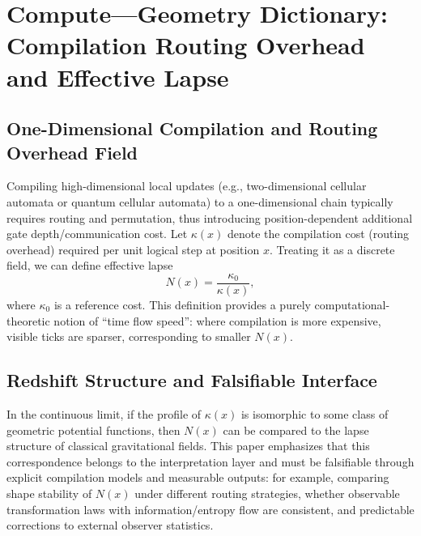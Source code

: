 \section{Compute---Geometry Dictionary: Compilation Routing Overhead and Effective Lapse}

\subsection{One-Dimensional Compilation and Routing Overhead Field}

Compiling high-dimensional local updates (e.g., two-dimensional cellular automata or quantum cellular automata) to a one-dimensional chain typically requires routing and permutation, thus introducing position-dependent additional gate depth/communication cost. Let $\kappa(x)$ denote the compilation cost (routing overhead) required per unit logical step at position $x$. Treating it as a discrete field, we can define effective lapse
\[
N(x)=\frac{\kappa_0}{\kappa(x)},
\]
where $\kappa_0$ is a reference cost. This definition provides a purely computational-theoretic notion of ``time flow speed'': where compilation is more expensive, visible ticks are sparser, corresponding to smaller $N(x)$.

\subsection{Redshift Structure and Falsifiable Interface}

In the continuous limit, if the profile of $\kappa(x)$ is isomorphic to some class of geometric potential functions, then $N(x)$ can be compared to the lapse structure of classical gravitational fields. This paper emphasizes that this correspondence belongs to the interpretation layer and must be falsifiable through explicit compilation models and measurable outputs: for example, comparing shape stability of $N(x)$ under different routing strategies, whether observable transformation laws with information/entropy flow are consistent, and predictable corrections to external observer statistics.
